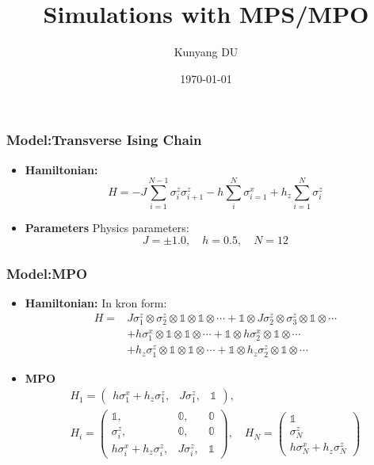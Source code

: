 \documentclass{beamer}
\title{Simulations with MPS/MPO}
\author{Kunyang DU}
\institute{Institue of Theoretical Physics}
\date{\today}
\begin{document}
\begin{frame}
	\titlepage
\end{frame}

\begin{frame}
	\frametitle{Model:Transverse Ising Chain}
	\begin{itemize}
		\item \textbf{Hamiltonian:} 
		\begin{equation}
			H = -J\sum_{i=1}^{N-1}\sigma_i^z \sigma_{i+1}^z -h\sum_i^N\sigma_{i=1}^x + h_z\sum_{i=1}^N\sigma_i^z
		\end{equation}
		\item \textbf{Parameters} Physics parameters:
		\begin{equation}
			J = \pm 1.0,\quad h = 0.5,\quad N = 12
		\end{equation}
	\end{itemize}
\end{frame}

\begin{frame}
	\frametitle{Model:MPO}
	\begin{itemize}
		\item \textbf{Hamiltonian:} In kron form:
		\begin{equation}
			\begin{aligned}
				H = & J\sigma_1^z\otimes\sigma_2^z\otimes \mathbb{1}\otimes\mathbb{1}\otimes\cdots + \mathbb{1}\otimes J\sigma_2^z\otimes\sigma_3^z\otimes \mathbb{1}\otimes\cdots\\
				&+h\sigma_1^x\otimes\mathbb{1}\otimes\mathbb{1}\otimes\cdots + \mathbb{1}\otimes h\sigma_2^x\otimes\mathbb{1}\otimes\cdots \\
				& + h_z\sigma_1^z\otimes\mathbb{1}\otimes\mathbb{1}\otimes\cdots + \mathbb{1}\otimes h_z\sigma_2^z\otimes\mathbb{1}\otimes\cdots
			\end{aligned}
		\end{equation}
		\item \textbf{MPO} 
		\begin{equation}
			\begin{gathered}
				H_1 = \begin{pmatrix}
					h\sigma_1^x + h_z \sigma_1^z,& J\sigma_1^z,&\mathbb{1}
				\end{pmatrix},\\
				H_i = \begin{pmatrix}
					\mathbb{1},&\mathbb{0},&\mathbb{0}\\
					\sigma_i^z,&\mathbb{0},&\mathbb{0}\\
					h\sigma_i^x + h_z \sigma_i^z,& J\sigma_i^z,&\mathbb{1}
				\end{pmatrix},\quad 
				H_N = \begin{pmatrix}
					\mathbb{1}\\ \sigma_N^z\\h\sigma_N^x + h_z \sigma_N^z
				\end{pmatrix}
			\end{gathered}
		\end{equation}
	\end{itemize}
\end{frame}
\end{document}
